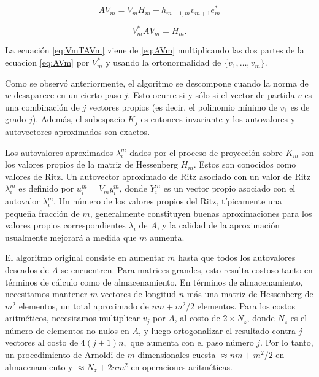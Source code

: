 \documentclass[a4paper,openright,12pt, oneside]{book}
\begin{document}
\begin{equation}
\label{eq:AVm}
\displaystyle A V_m \textstyle = \displaystyle V_m H_m + h_{m+1,m} v_{m+1} e_m^{\ast}
\end{equation}

\begin{equation}
\label{eq:VmTAVm}
\displaystyle V_m^{\ast} A V_m \textstyle = \displaystyle H_m.
\end{equation}

La ecuaci\'on \ref{eq:VmTAVm} viene de \ref{eq:AVm} multiplicando las dos partes de la ecuacion \ref{eq:AVm} por $ V_m^{\ast}$ y usando la ortonormalidad de $\{ v_1, \ldots,v_m \} $.

Como se observ\'o anteriormente, el algoritmo se descompone cuando la norma de $ w $  desaparece en un cierto paso $ j $. Esto ocurre si y s\'olo si el vector de partida $ v $ es una combinaci\'on de $ j $ vectores propios (es decir, el polinomio m\'inimo de $ v_1 $ es de grado $ j $). Adem\'as, el subespacio $ K_j $ es entonces invariante y los autovalores y autovectores aproximados son exactos. \cite{booksaad}

Los autovalores aproximados $ \lambda_i^{m} $ dados por el proceso de proyecci\'on sobre $ K_m $ son los valores propios de la matriz de Hessenberg $ H_m $. Estos son conocidos como valores de Ritz. Un autovector aproximado de Ritz asociado con un valor de Ritz $ \lambda_i ^ {m} $ es definido por $ u_i ^ {m} = V_m y_i ^ {m} $, donde $
Y_i ^ {m} $ es un vector propio asociado con el autovalor $ \lambda_i ^ {m} $. Un n\'umero de los valores propios del Ritz, t\'ipicamente una peque\~na fracci\'on de $ m $, generalmente constituyen buenas aproximaciones para los valores propios correspondientes $ \lambda_i $ de $ A $, y la calidad de la aproximaci\'on usualmente mejorar\'a a medida que $ m $ aumenta.

El algoritmo original consiste en aumentar $ m $ hasta que todos los autovalores deseados de $ A $ se encuentren. Para matrices grandes, esto resulta costoso tanto en t\'erminos de c\'alculo como de almacenamiento. En t\'erminos de almacenamiento, necesitamos mantener $ m $ vectores de longitud $ n $ m\'as una matriz de Hessenberg de $ m^2 $ elementos, un total aproximado de $ n m + m ^ 2/2 $ elementos.
 Para los costos aritm\'eticos, necesitamos multiplicar $ v_j $ por $ A $, al costo de $ 2 \times N_z $, donde $ N_z $ es el n\'umero de elementos no nulos en $ A $, y luego ortogonalizar el resultado contra $ j $ vectores al costo de $ 4 (j + 1) n, $ que aumenta con el paso n\'umero $ j $. Por lo tanto, un procedimiento de Arnoldi de $ m $-dimensionales cuesta $ \approx n m + m ^ 2/2 $ en almacenamiento y $ \approx N_z + 2 n m ^ 2 $ en operaciones aritm\'eticas.
\end{document}
